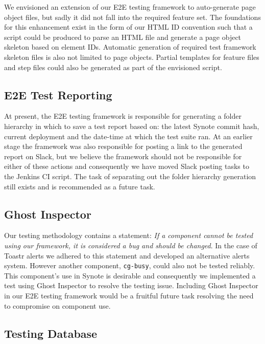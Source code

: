 We envisioned an extension of our E2E testing framework to auto-generate page object files, but sadly it did not fall into the required feature set. The foundations for this enhancement exist in the form of our HTML ID convention such that a script could be produced to parse an HTML file and generate a page object skeleton based on element IDs. Automatic generation of required test framework skeleton files is also not limited to page objects. Partial templates for feature files and step files could also be generated as part of the envisioned script.\\    

\subsection{E2E Test Reporting}
\label{subsec:e2e-test-reporting}

At present, the E2E testing framework is responsible for generating a folder hierarchy  in which to save a test report based on: the latest Synote commit hash, current deployment and the date-time at which the test suite ran. At an earlier stage the framework was also responsible for posting a link to the generated report on Slack, but we believe the framework should not be responsible for either of these actions and consequently we have moved Slack posting tasks to the Jenkins CI script. The task of separating out the folder hierarchy generation still exists and is recommended as a future task.\\

\subsection{Ghost Inspector}
\label{subsec:ghost-inspector}

Our testing methodology contains a statement: \textit{If a component cannot be tested using our framework, it is considered a bug and should be changed}. In the case of Toastr alerts we adhered to this statement and developed an alternative alerts system. However another component, \texttt{cg-busy}, could also not be tested reliably. This component's use in Synote is desirable and consequently we implemented a test using Ghost Inspector to resolve the testing issue. Including Ghost Inspector in our E2E testing framework would be a fruitful future task resolving the need to compromise on component use.\\ 

\subsection{Testing Database}
\label{subsec:testing-database}

